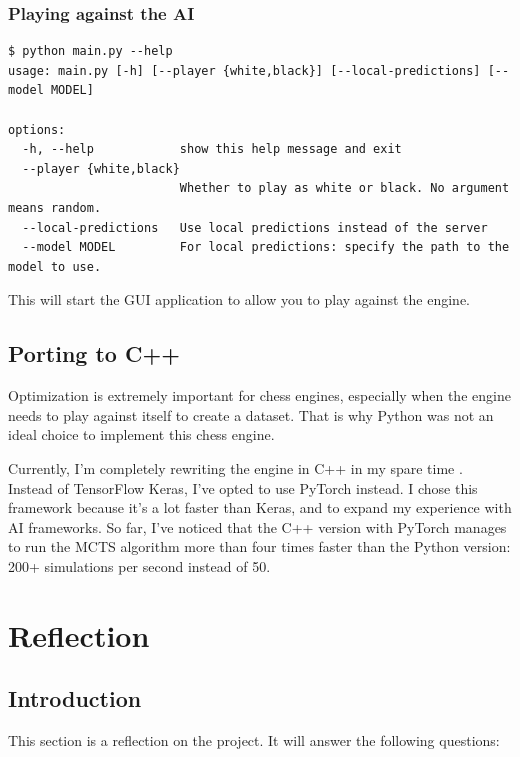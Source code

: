 \documentclass{article}
\begin{document}
\subsubsection{Playing against the AI}

\begin{verbatim}
$ python main.py --help
usage: main.py [-h] [--player {white,black}] [--local-predictions] [--model MODEL]

options:
  -h, --help            show this help message and exit
  --player {white,black}
                        Whether to play as white or black. No argument means random.
  --local-predictions   Use local predictions instead of the server
  --model MODEL         For local predictions: specify the path to the model to use.
\end{verbatim}

This will start the GUI application to allow you to play against the engine. 

\subsection{Porting to C++}

Optimization is extremely important for chess engines, especially when the engine needs to play
against itself to create a dataset. That is why Python was not an ideal choice to implement this chess engine.

Currently, I'm completely rewriting the engine in C++ in my spare time \cite{zjefferChessdeeprlcpp2022}. 
Instead of TensorFlow Keras, I've opted to use PyTorch instead. I chose this framework because 
it's a lot faster than Keras, and to expand my experience with AI frameworks.
So far, I've noticed that the C++ version with PyTorch manages to run the MCTS algorithm 
more than four times faster than the Python version: 200+ simulations per second instead of 50.




\newpage
\section{Reflection}

\subsection{Introduction}

This section is a reflection on the project. It will answer the following questions:
\end{document}
